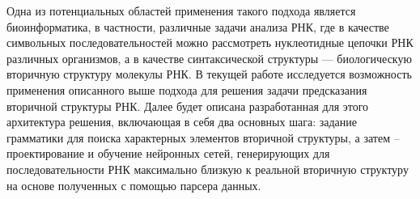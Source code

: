Одна из потенциальных областей применения такого подхода является биоинформатика, в частности, различные задачи анализа РНК, где в качестве символьных последовательностей можно рассмотреть нуклеотидные цепочки РНК различных организмов, а в качестве синтаксической структуры --- биологическую вторичную структуру молекулы РНК. В текущей работе исследуется возможность применения описанного выше подхода для решения задачи предсказания вторичной структуры РНК. Далее будет описана разработанная для этого архитектура решения, включающая в себя два основных шага: задание грамматики для поиска характерных элементов вторичной структуры, а затем -- проектирование и обучение нейронных сетей, генерирующих для последовательности РНК максимально близкую к реальной вторичную структуру на основе полученных с помощью парсера данных.

